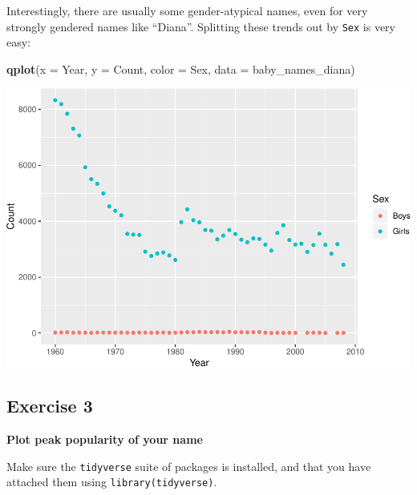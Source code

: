 \documentclass[
]{book}
\newenvironment{Shaded}{\begin{snugshade}}{\end{snugshade}}
\newcommand{\DataTypeTok}[1]{\textcolor[rgb]{0.13,0.29,0.53}{#1}}
\newcommand{\KeywordTok}[1]{\textcolor[rgb]{0.13,0.29,0.53}{\textbf{#1}}}
\newcommand{\NormalTok}[1]{#1}
\begin{document}
Interestingly, there are usually some gender-atypical names, even for very strongly
gendered names like ``Diana''. Splitting these trends out by \texttt{Sex} is very easy:

\begin{Shaded}
\begin{Highlighting}[]
\KeywordTok{qplot}\NormalTok{(}\DataTypeTok{x =}\NormalTok{ Year, }\DataTypeTok{y =}\NormalTok{ Count, }\DataTypeTok{color =}\NormalTok{ Sex,}
      \DataTypeTok{data =}\NormalTok{ baby_names_diana)}
\end{Highlighting}
\end{Shaded}

\includegraphics{R/Rintro/figures/unnamed-chunk-32-1.pdf}

\hypertarget{exercise-3}{%
\subsection{Exercise 3}\label{exercise-3}}

\textbf{Plot peak popularity of your name}

Make sure the \texttt{tidyverse} suite of packages is installed, and that you
have attached them using \texttt{library(tidyverse)}.
\end{document}
